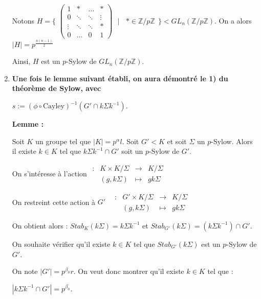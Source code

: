 \documentclass{report}
\newenvironment{lemme}[2][white]{\begin{tcolorbox}[colframe= #1]
    \textbf{Lemme :} #2  \par}
    {\end{tcolorbox}}
\newcommand{\fonction}[5]{
    \begin{array}{l|rcl}
    #1: & #2 & \longrightarrow & #3 \\
        & #4 & \longmapsto & #5 
    \end{array}
}
\newcommand{\Z}{\mathbb{Z}}
\begin{document}
\begin{enumerate}
            Notons $H = \Bigg \{ $
            $
            \begin{pmatrix}
                1 & * & \dots& *\\  
                0 & \ddots & \ddots& \vdots\\
                \vdots & \ddots & \ddots& *   \\
                0 & \dots & 0& 1
            \end{pmatrix} 
            ~~~ \Biggl |~~~~*\in \Z / p\Z~~ \Bigg \} <GL_n\left(\Z / p\Z \right)$. On a alors $|H| = p^{\tfrac{n(n-1)}{2}}$
            
            Ainsi, $H$ est un $p$-Sylow de $GL_n(\Z / p\Z) .$
             
            \item \textbf{Une fois le lemme suivant établi, on aura démontré le 1) du théorème de Sylow, avec }


            \begin{center}
                $s:=\left( \phi \circ \text{Cayley}\right)^{-1}\left( G' \cap k \Sigma k^{-1}\right)$.
            \end{center} 
            
            \begin{lemme}{}
            	Soit $K$ un groupe tel que $|K| = p^\alpha l$. Soit $G'<K$ et soit $\Sigma $ un $p$-Sylow. Alors il existe $k\in K$ tel que $k\Sigma k^{-1}\cap G'$ soit un $p$-Sylow de $G'$.
            \end{lemme}
            
                On s'intéresse à l'action $\fonction{}{K\times K/\Sigma}{K/\Sigma}{(g,k\Sigma)}{gk\Sigma}$
            
            
            On restreint cette action à $G'~~~~\fonction{}{G'\times K/\Sigma}{K/\Sigma}{(g, k\Sigma)}{gk\Sigma}$
            
            
            
            On obtient alors : $Stab_K(k\Sigma)=k\Sigma k^{-1}$ et $Stab_{G'}(k\Sigma)=(k\Sigma k^{-1})\cap G'$. 
            
             
            
            On souhaite vérifier qu'il existe $k \in K$ tel que $Stab_{G'}(k\Sigma)$ est un $p$-Sylow de $G'$. 
            
            On note $|G'|=p^{\beta_0 }r$. On veut donc montrer qu'il existe $k\in K$ tel que :
            
            \begin{center}
                 $|k\Sigma k^{-1}\cap G'|=p^{\beta _ 0}$.
            \end{center}
            

\end{enumerate}
\end{document}
